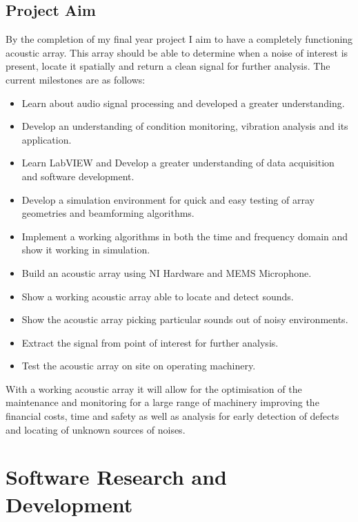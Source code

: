 \documentclass{UoNMCHA}
\numberwithin{equation}{section}
\begin{document}
\subsection{Project Aim} \label{sec:Project  Aim}
    By the completion of my final year project I aim to have a completely functioning acoustic array. This array should be able to determine when a noise of interest is present, locate it spatially and return a clean signal for further analysis. The current milestones are as follows:
    
    \begin{itemize}
        \item Learn about audio signal processing and developed a greater understanding.
        \item Develop an understanding of condition monitoring, vibration analysis and its application.
        \item Learn LabVIEW and Develop a greater understanding of data acquisition and software development.
        \item Develop a simulation environment for quick and easy testing of array geometries and beamforming algorithms.
        \item Implement a working algorithms in both the time and frequency domain and show it working in simulation.
        \item Build an acoustic array using NI Hardware and MEMS Microphone.
        \item Show a working acoustic array able to locate and detect sounds.
        \item Show the acoustic array picking particular sounds out of noisy environments.
        \item Extract the signal from point of interest for further analysis.
        \item Test the acoustic array on site on operating machinery.
    \end{itemize}
    
    With a working acoustic array it will allow for the optimisation of the maintenance and monitoring for a large range of machinery improving the financial costs, time and safety as well as analysis for early detection of defects and locating of unknown sources of noises.
\newpage
\section{Software Research and Development} \label{sec:Software}
\end{document}
